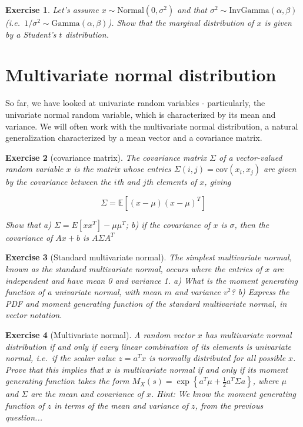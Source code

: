 \documentclass[twoside]{article}
\newcounter{lecnum}
\newtheorem{exercise}{Exercise}[lecnum]
\newcommand\E{\mathbb{E}}
\newcommand\cov{\mbox{cov}}
\begin{document}
\begin{exercise}
  Let's assume $x \sim \mbox{Normal}(0, \sigma^2)$ and that $\sigma^2\sim\mbox{InvGamma}(\alpha,\beta)$ (i.e.\ $1/\sigma^2 \sim \mbox{Gamma}(\alpha,\beta)$). Show that the marginal distribution of $x$ is given by a Student's $t$ distribution.
\end{exercise}

\section{Multivariate normal distribution}

So far, we have looked at univariate random variables - particularly, the univariate normal random variable, which is characterized by its mean and variance. We will often work with the multivariate normal distribution, a natural generalization characterized by a mean vector and a covariance matrix.

\begin{exercise}[covariance matrix]
  The covariance matrix $\Sigma$ of a vector-valued random variable $x$ is the matrix whose entries $\Sigma(i,j) = \cov(x_i,x_j)$ are given by the covariance between the $i$th and $j$th elements of $x$, giving

  $$\Sigma = \E\left[(x-\mu)(x-\mu)^T\right]$$

  Show that a) $\Sigma = E[xx^T] - \mu\mu^T$; b) if the covariance of $x$ is $\sigma$, then the covariance of $Ax+b$ is $A\Sigma A^T$
\end{exercise}

\begin{exercise}[Standard multivariate normal]
  The simplest multivariate normal, known as the standard multivariate normal, occurs where the entries of $x$ are independent and have mean 0 and variance 1. a) What is the moment generating function of a univariate normal, with mean $m$ and variance $v^2$? b) Express the PDF and moment generating function of the standard multivariate normal, in vector notation.
\end{exercise}


\begin{exercise}[Multivariate normal]
  A random vector $x$ has multivariate normal distribution if and only if every linear combination of its elements is univariate normal, i.e.\ if the scalar value $z = a^Tx$ is normally distributed for all possible $x$. Prove that this implies that $x$ is multivariate normal if and only if its moment generating function takes the form $M_X(s) = \exp\left\{a^T\mu + \frac{1}{2}a^T\Sigma a\right\}$, where $\mu$ and $\Sigma$ are the mean and covariance of $x$. \textit{Hint: We know the moment generating function of $z$ in terms of the mean and variance of $z$, from the previous question...}
\end{exercise}
  
\end{document}
